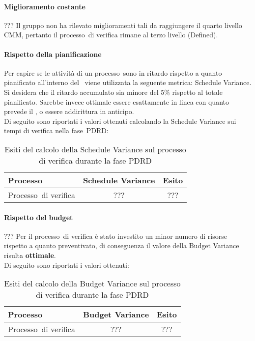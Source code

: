 \documentclass[../PianoDiQualifica.tex]{subfiles}
\begin{document}
\begin{appendices}
			\paragraph{Miglioramento costante}
			??? Il gruppo non ha rilevato miglioramenti tali da raggiungere il quarto livello CMM\g, pertanto il processo\g\ di verifica rimane al terzo livello (Defined).
			
			\paragraph{Rispetto della pianificazione}
			Per capire se le attività di un processo\g\ sono in ritardo rispetto a quanto pianificato all'interno del \pianodiprogetto\ viene utilizzata la seguente metrica: Schedule Variance.\\
			Si desidera che il ritardo accumulato sia minore del 5\% rispetto al totale pianificato. Sarebbe invece ottimale essere esattamente in linea con quanto prevede il \pianodiprogetto, o essere addirittura in anticipo.\\
			Di seguito sono riportati i valori ottenuti calcolando la Schedule Variance sui tempi di verifica nella fase\g\ PDRD:
			
			\begin{table}[H]
				\centering
				\begin{tabular}{l * {2}{c}}
					\toprule
					\textbf{Processo} & \textbf{Schedule Variance} & \textbf{Esito} \\
					\midrule
					Processo\g\ di verifica & ??? &  ??? \\
					\bottomrule
				\end{tabular}
				\caption{Esiti del calcolo della Schedule Variance sul processo di verifica durante la fase PDRD}
				\label{tab:esiti_schedule_variance}
			\end{table}
			
			\paragraph{Rispetto del budget}
			??? Per il processo\g\ di verifica è stato investito un minor numero di risorse rispetto a quanto preventivato, di conseguenza il valore della Budget Variance risulta \textbf{ottimale}.\\
			Di seguito sono riportati i valori ottenuti:
			\begin{table}[H]
				\centering
				\begin{tabular}{l * {2}{c}}
					\toprule
					\textbf{Processo} & \textbf{Budget Variance} & \textbf{Esito} \\
					\midrule
					Processo\g\ di verifica & ??? &  ??? \\
					\bottomrule
				\end{tabular}
				\caption{Esiti del calcolo della Budget Variance sul processo di verifica durante la fase PDRD}
				\label{tab:esiti_budget_variance}
			\end{table}
	

\end{appendices}
\end{document}
